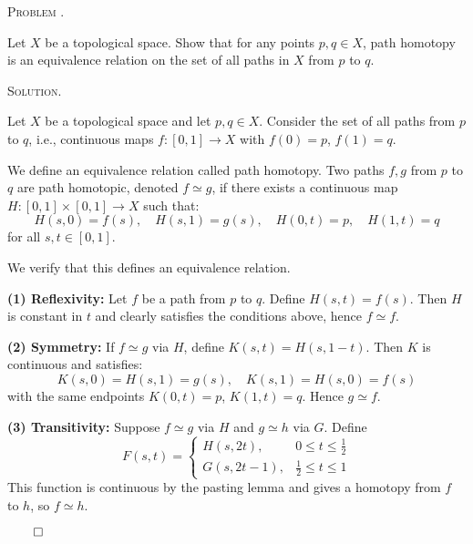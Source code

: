 \documentclass[12pt, a4paper, oneside]{ctexart}
\newcounter{problemname}
\newenvironment{problem}{\begin{framed}\stepcounter{problemname}\par\noindent\textsc{Problem \arabic{problemname}. }}{\end{framed}\par}
\newenvironment{solution}{%
	\par\noindent\textsc{Solution. }\ignorespaces
}{%
	\hfill$\qed$\par
}
\begin{document}
	\begin{problem}
		
        Let $X$ be a topological space. Show that for any points $p, q \in X$, path 
        homotopy is an equivalence relation on the set of all paths in $X$ 
        from $p$ to $q$.

	\end{problem}
	
	\begin{solution}
		
                Let \( X \) be a topological space and let \( p, q \in X \). Consider the set of all paths from \( p \) to \( q \), i.e., continuous maps \( f: [0,1] \to X \) with \( f(0) = p \), \( f(1) = q \).

                We define an equivalence relation called path homotopy. Two paths \( f, g \) from \( p \) to \( q \) are path homotopic, denoted \( f \simeq g \), if there exists a continuous map \( H: [0,1] \times [0,1] \to X \) such that:
                \[
                H(s, 0) = f(s),\quad H(s, 1) = g(s),\quad H(0, t) = p,\quad H(1, t) = q
                \]
                for all \( s, t \in [0,1] \).

                We verify that this defines an equivalence relation.

                \textbf{(1) Reflexivity:}  
                Let \( f \) be a path from \( p \) to \( q \). Define \( H(s, t) = f(s) \). Then \( H \) is constant in \( t \) and clearly satisfies the conditions above, hence \( f \simeq f \).

                \textbf{(2) Symmetry:}  
                If \( f \simeq g \) via \( H \), define \( K(s, t) = H(s, 1 - t) \). Then \( K \) is continuous and satisfies:
                \[
                K(s, 0) = H(s, 1) = g(s),\quad K(s, 1) = H(s, 0) = f(s)
                \]
                with the same endpoints \( K(0, t) = p \), \( K(1, t) = q \). Hence \( g \simeq f \).

                \textbf{(3) Transitivity:}  
                Suppose \( f \simeq g \) via \( H \) and \( g \simeq h \) via \( G \). Define
                \[
                F(s, t) = 
                \begin{cases}
                H(s, 2t), & 0 \le t \le \tfrac{1}{2} \\
                G(s, 2t - 1), & \tfrac{1}{2} \le t \le 1
                \end{cases}
                \]
                This function is continuous by the pasting lemma and gives a homotopy from \( f \) to \( h \), so \( f \simeq h \).
		
	\end{solution}
	
\end{document}
